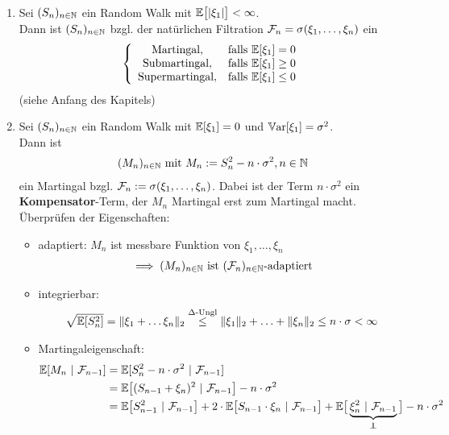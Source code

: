 \begin{beisp}\
\begin{enumerate}[label=(\alph*)]
\item Sei $(S_n)_{n\in\mathbb{N}}$ ein Random Walk mit $\mathbb{E}\big[|\xi_1|\big]<\infty$.\\
Dann ist $(S_n)_{n\in\mathbb{N}}$ bzgl. der natürlichen Filtration $\mathcal{F}_n=\sigma(\xi_1,\ldots,\xi_n)$ ein
\begin{align*}
\left\lbrace\begin{array}{cl}
\text{Martingal}, & \text{falls } \mathbb{E}[\xi_1]=0\\
\text{Submartingal}, & \text{falls } \mathbb{E}[\xi_1]\geq0\\
\text{Supermartingal}, & \text{falls } \mathbb{E}[\xi_1]\leq0\\
\end{array}\right.
\end{align*}
(siehe Anfang des Kapitels)
\item Sei $(S_n)_{n\in\mathbb{N}}$ ein Random Walk mit $\mathbb{E}[\xi_1]=0$ und $\mathbb{V}\text{ar}[\xi_1]=\sigma^2$.\\
Dann ist 
\begin{align*}
(M_n)_{n\in\mathbb{N}}\text{ mit } M_n:=S_n^2-n\cdot\sigma^2,n\in\mathbb{N}
\end{align*}
ein Martingal bzgl. $\mathcal{F}_n:=\sigma(\xi_1,\ldots,\xi_n)$. Dabei ist der Term $n\cdot\sigma^2$ ein \textbf{Kompensator}-Term, der $M_n$ Martingal erst zum Martingal macht. Überprüfen der Eigenschaften:
\begin{itemize}
\item adaptiert: $M_n$ ist messbare Funktion von $\xi_1,\ldots,\xi_n$
\begin{align*}
	\implies(M_n)_{n\in\mathbb{N}} \text{ ist } (\mathcal{F}_n)_{n\in\mathbb{N}}\text{-adaptiert}
\end{align*}
\item integrierbar: \begin{align*}
\sqrt{\mathbb{E}[S_n^2]}=\Vert\xi_1+\ldots\xi_n\Vert_2\stackrel{\Delta\text{-Ungl}}{\leq}\Vert\xi_1\Vert_2+\ldots+\Vert\xi_n\Vert_2\leq n\cdot\sigma<\infty
\end{align*}
\item Martingaleigenschaft:
\begin{align*}
\E[M_n~|~\F_{n-1}]
&=\E[S_n^2-n\cdot\sigma^2~|~\F_{n-1}]\\
&=\E\big[(S_{n-1}+\xi_n)^2~|~\F_{n-1}\big]-n\cdot\sigma^2\\
&=\E\big[S_{n-1}^2~|~\F_{n-1}\big]+2\cdot\E\big[S_{n-1}\cdot\xi_n~|~\F_{n-1}\big]+\E\big[\underbrace{\xi_n^2~|~\F_{n-1}}_{\unab}\big]-n\cdot\sigma^2\\

\end{align*}
\end{itemize}
\end{enumerate}
\end{beisp}

